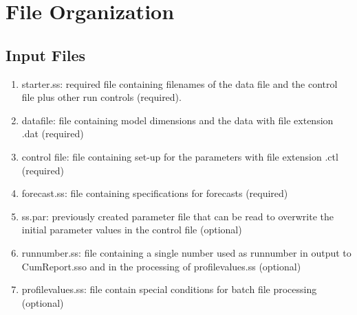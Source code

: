 		
\section{File Organization}\label{FileOrganization}		
	\subsection{Input Files}
	\begin{enumerate}
		\item starter.ss:   required file containing filenames of the data file and the control file plus other run controls (required).
		\item datafile:  file containing model dimensions and the data with file extension .dat (required)
		\item control file:  file containing set-up for the parameters with file extension .ctl (required)
		\item forecast.ss:  file containing specifications for forecasts (required) 
		\item ss.par:  previously created parameter file that can be read to overwrite the initial parameter values in the control file (optional)
		\item runnumber.ss:  file containing a single number used as runnumber in output to CumReport.sso and in the processing of profilevalues.ss (optional)
		\item profilevalues.ss:  file contain special conditions for batch file processing (optional)
	\end{enumerate}
	
